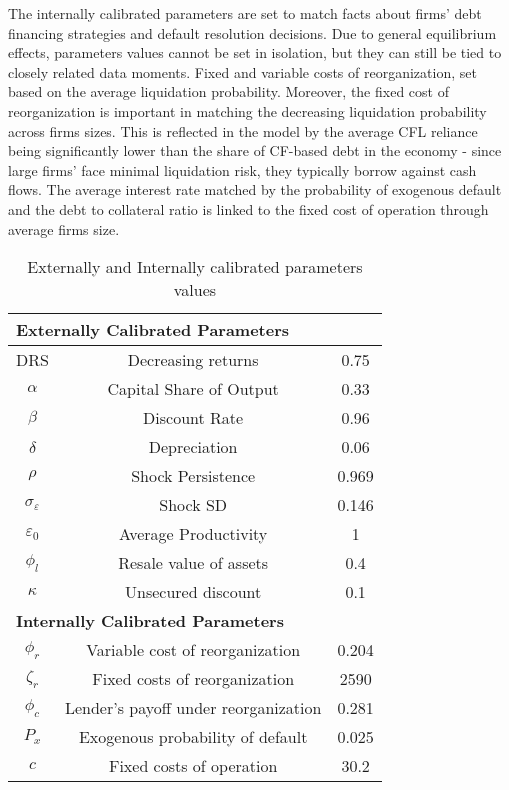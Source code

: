 \documentclass[12pt]{article}
\begin{document}
The internally calibrated parameters are set to match facts about firms' debt financing strategies and default resolution decisions. Due to general equilibrium effects, parameters values cannot be set in isolation, but they can still be tied to closely related data moments. Fixed and variable costs of reorganization, set based on the average liquidation probability. Moreover, the fixed cost of reorganization is important in matching the decreasing liquidation probability across firms sizes. This is reflected in the model by the average CFL reliance being significantly lower than the share of CF-based debt in the economy - since large firms' face minimal liquidation risk, they typically borrow against cash flows. The average interest rate matched by the probability of exogenous default and the debt to collateral ratio is linked to the fixed cost of operation through average firms size. 

\begin{table}[h!]
    \centering
    \begin{tabular}{c|c|c}
    \multicolumn{3}{l}{\textbf{Externally Calibrated Parameters}} \\ 
    \midrule
    DRS & Decreasing returns & 0.75 \\
    $\alpha$ & Capital Share of Output & 0.33 \\
    $\beta$ & Discount Rate & 0.96 \\
    $\delta$ & Depreciation & 0.06 \\
    $\rho$ & Shock Persistence & 0.969 \\
    $\sigma_{\varepsilon}$ & Shock SD & 0.146 \\
    $\varepsilon_0$ & Average Productivity & 1 \\
    $\phi_l$ & Resale value of assets & 0.4 \\
    $\kappa$ & Unsecured discount & 0.1 \vspace{3mm} \\
    \multicolumn{3}{l}{\textbf{Internally Calibrated Parameters}} \\ 
    \midrule
    $\phi_r$ & Variable cost of reorganization & 0.204 \\
    $\zeta_r$ & Fixed costs of reorganization & 2590 \\
    $ \phi_c $ & Lender's payoff under reorganization  & 0.281 \\
    $P_x$ & Exogenous probability of default & 0.025 \\
    $ c $ & Fixed costs of operation & 30.2 \\
    \bottomrule
    \end{tabular}
    \caption{Externally and Internally calibrated parameters values}
    \label{tab:external calib}
\end{table}
\end{document}
